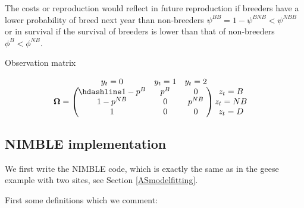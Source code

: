 \documentclass[
  12pt,
]{krantz}
\begin{document}
The costs or reproduction would reflect in future reproduction if breeders have a lower probability of breed next year than non-breeders \(\psi^{BB} = 1 - \psi^{BNB} < \psi^{NBB}\) or in survival if the survival of breeders is lower than that of non-breeders \(\phi^B < \phi^{NB}\).

Observation matrix

\[
\begin{matrix}
& \\
\mathbf{\Omega} =
    \left ( \vphantom{ \begin{matrix} 12 \\ 12 \\ 12 \end{matrix} } \right .
\end{matrix}
\hspace{-1.2em}
\begin{matrix}
    y_t=0 & y_t=1 & y_t=2 \\ \hdashline
1 - p^B & p^B & 0\\
1 - p^{NB} & 0 & p^{NB}\\
1 & 0 & 0
\end{matrix}
\hspace{-0.2em}
\begin{matrix}
& \\
\left . \vphantom{ \begin{matrix} 12 \\ 12 \\ 12 \end{matrix} } \right )
    \begin{matrix}
    z_{t}=B \\ z_{t}=NB \\ z_{t}=D
    \end{matrix}
\end{matrix}
\]

\hypertarget{nimble-implementation-3}{%
\subsection{NIMBLE implementation}\label{nimble-implementation-3}}

We first write the NIMBLE code, which is exactly the same as in the geese example with two sites, see Section \ref{ASmodelfitting}.

First some definitions which we comment:
\end{document}
